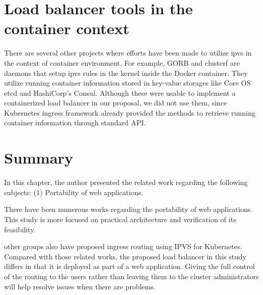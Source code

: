 \section{Load balancer tools in the container context}

There are several other projects where efforts have been made to utilize ipvs in the context of container environment.
For example, GORB\cite{Sibiryov2015} and clusterf\cite{Aaltodoc:http://urn.fi/URN:NBN:fi:aalto-201611025433} are daemons 
that setup ipvs rules in the kernel inside the Docker container. 
They utilize running container information stored in key-value storages
like Core OS etcd\cite{CoreOSEtcd} and HashiCorp's Consul\cite{HashiCorpConsul}. 
Although these were usable to implement a containerized load balancer in our proposal, we did not use them, 
since Kubernetes ingress framework already provided the methods to retrieve running container information through standard API.

\section{Summary}

In this chapter, the author presented the related work regarding the following subjects:
(1) Portability of web applications.

There have been numerous works regarding the portability of web applications.
This study is more focused on practical architecture and verification of its feasibility.


other groups also have proposed ingress routing using IPVS for Kubernetes.
Compared with those related works, the proposed load balancer in this study differs in that it is deployed as part of a web application.
Giving the full control of the routing to the users rather than leaving them to the cluster administrators will help resolve issues when there are problems.

